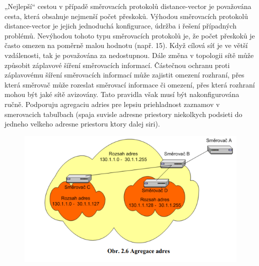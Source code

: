 „Nejlepší“ cestou v případě směrovacích protokolů distance-vector je považována cesta, 
která obsahuje nejmenší počet přeskoků. Výhodou směrovacích protokolů distance-vector je 
jejich jednoduchá konfigurace, údržba i řešení případných problémů.
Nevýhodou tohoto typu směrovacích protokolů je, že počet přeskoků je často omezen 
na poměrně malou hodnotu (např. 15). Když cílová síť je ve větší vzdálenosti, tak je 
považována za nedostupnou. Dále změna v topologii sítě může způsobit záplavové šíření 
směrovacích informací. Částečnou ochranu proti záplavovému šíření směrovacích informací 
může zajistit omezení rozhraní, přes která směrovač může rozeslat směrovací informace či 
omezení, přes která rozhraní mohou být jaké sítě avizovány. Tato pravidla však musí být 
nakonfigurována ručně. Podporuju agregaciu adries pre lepsiu priehladnost zaznamov v smerovacich tabulbach (spaja suvisle adresne priestory niekolkych podsieti do jedneho velkeho adresne priestoru ktory dalej siri).
\begin{figure}[!h]
  \begin{center}
    \includegraphics[scale=1]{images/agregacia.png}
  \end{center}
\end{figure}
